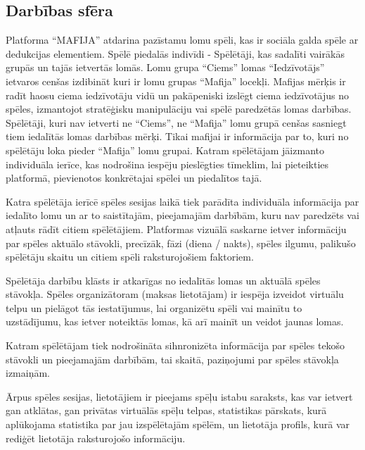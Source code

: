 \subsection*{Darbības sfēra}

Platforma ``MAFIJA'' atdarina pazīstamu lomu spēli, kas ir sociāla galda spēle ar dedukcijas elementiem.
Spēlē piedalās indivīdi - Spēlētāji, kas sadalīti vairākās grupās un tajās ietvertās lomās.
Lomu grupa ``Ciems'' lomas ``Iedzīvotājs'' ietvaros cenšas izdibināt kuri ir lomu grupas ``Mafija'' locekļi.
Mafijas mērķis ir radīt haosu ciema iedzīvotāju vidū un pakāpeniski izslēgt ciema iedzīvotājus no spēles, izmantojot stratēģisku manipulāciju vai spēlē paredzētās lomas darbības.
Spēlētāji, kuri nav ietverti ne ``Ciems”, ne “Mafija'' lomu grupā cenšas sasniegt tiem iedalītās lomas darbības mērķi.
Tikai mafijai ir informācija par to, kuri no spēlētāju loka pieder ``Mafija'' lomu grupai.
Katram spēlētājam jāizmanto individuāla ierīce, kas nodrošina iespēju pieslēgties tīmeklim, lai pieteikties platformā, pievienotos konkrētajai spēlei un piedalītos tajā.

Katra spēlētāja ierīcē spēles sesijas laikā tiek parādīta individuāla informācija par iedalīto lomu un ar to saistītajām, pieejamajām darbībām, kuru nav paredzēts vai atļauts rādīt citiem spēlētājiem.
Platformas vizuālā saskarne ietver informāciju par spēles aktuālo stāvokli, precīzāk, fāzi (diena / nakts), spēles ilgumu, palikušo spēlētāju skaitu un citiem spēli raksturojošiem faktoriem.

Spēlētāja darbību klāsts ir atkarīgas no iedalītās lomas un aktuālā spēles stāvokļa.
Spēles organizātoram (maksas lietotājam) ir iespēja izveidot virtuālu telpu un pielāgot tās iestatījumus, lai organizētu spēli vai mainītu to uzstādījumu, kas ietver noteiktās lomas, kā arī mainīt un veidot jaunas lomas.

Katram spēlētājam tiek nodrošināta sihnronizēta informācija par spēles tekošo  stāvokli un pieejamajām darbībām, tai skaitā, paziņojumi par spēles stāvokļa izmaiņām.

Ārpus spēles sesijas, lietotājiem ir pieejams spēļu istabu saraksts, kas var ietvert gan atklātas, gan privātas virtuālās spēļu telpas, statistikas pārskats, kurā aplūkojama statistika par jau izspēlētajām spēlēm, un lietotāja profils, kurā var rediģēt lietotāja raksturojošo informāciju.
